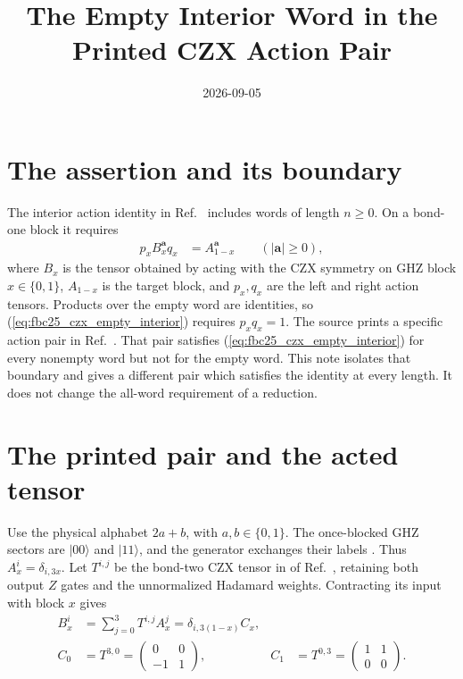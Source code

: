 \documentclass{article}
\title{The Empty Interior Word in the Printed CZX Action Pair}
\author{}
\date{2026-09-05}
\begin{document}
\maketitle
{}

\section{The assertion and its boundary}

The interior action identity  in
Ref.~\cite[lines~1841--1870]{FrancoRubio2025MPUGauging} includes words of
length $n\geq0$. On a bond-one block it requires
\begin{align}
    p_x B_x^{\mathbf a}q_x & =A_{1-x}^{\mathbf a}
    \qquad (|\mathbf a|\geq0),
    \label{eq:fbc25_czx_empty_interior}
\end{align}
where $B_x$ is the tensor obtained by acting with the CZX symmetry on GHZ
block $x\in\{0,1\}$, $A_{1-x}$ is the target block, and $p_x,q_x$ are the
left and right action tensors. Products over the empty word are identities,
so (\ref{eq:fbc25_czx_empty_interior}) requires $p_xq_x=1$.
The source prints a specific action pair in
Ref.~\cite[lines~4690--4694]{FrancoRubio2025MPUGauging}. That pair satisfies
(\ref{eq:fbc25_czx_empty_interior}) for every nonempty word but not for the
empty word. This note isolates that boundary and gives a different pair
which satisfies the identity at every length. It does not change the
all-word requirement of a reduction.

\section{The printed pair and the acted tensor}

Use the physical alphabet $2a+b$, with $a,b\in\{0,1\}$. The once-blocked
GHZ sectors are $|00\rangle$ and $|11\rangle$, and the generator exchanges
their labels \cite[lines~4660--4670]{FrancoRubio2025MPUGauging}. Thus
$A_x^i=\delta_{i,3x}$. Let $T^{i,j}$ be the bond-two CZX tensor in
 of
Ref.~\cite[lines~4505--4547]{FrancoRubio2025MPUGauging}, retaining both
output $Z$ gates and the unnormalized Hadamard weights. Contracting its input
with block $x$ gives
\begin{align}
    B_x^i & =\sum_{j=0}^3 T^{i,j}A_x^j
    =\delta_{i,3(1-x)}C_x,
    \label{eq:fbc25_czx_empty_acted_sector}                                                                  \\
    C_0   & =T^{3,0}=\begin{pmatrix}0&0\\-1&1\end{pmatrix},
          & C_1                                             & =T^{0,3}=\begin{pmatrix}1&1\\0&0\end{pmatrix}.
    \label{eq:fbc25_czx_empty_action_matrices}
\end{align}
\end{document}
